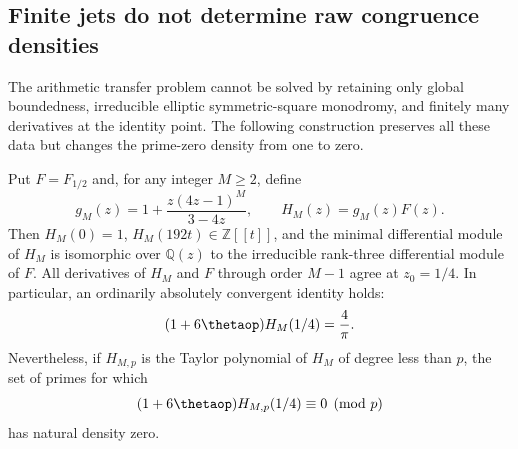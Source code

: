 \subsection{Finite jets do not determine raw congruence densities}
\label{subsec:C-gauge-obstruction}
The arithmetic transfer problem cannot be solved by retaining only
global boundedness, irreducible elliptic symmetric-square monodromy,
and finitely many derivatives at the identity point.  The following
construction preserves all these data but changes the prime-zero
density from one to zero.

\begin{proposition}\label{prop:C-finite-jet-density-zero}
Put $F=F_{1/2}$ and, for any integer $M\ge2$, define
\[
 g_M(z)=1+\frac{z(4z-1)^M}{3-4z},\qquad H_M(z)=g_M(z)F(z).
\]
Then $H_M(0)=1$, $H_M(192t)\in\mathbb Z[[t]]$, and the minimal
differential module of $H_M$ is isomorphic over $\mathbb Q(z)$ to
the irreducible rank-three differential module of $F$.
All derivatives of $H_M$ and $F$ through order $M-1$ agree at
$z_0=1/4$.  In particular, an ordinarily absolutely convergent
identity holds:
\[
 (1+6\thetaop)H_M(1/4)=\frac4\pi.
\]
Nevertheless, if $H_{M,p}$ is the Taylor polynomial of $H_M$ of
degree less than $p$, the set of primes for which
\[
 (1+6\thetaop)H_{M,p}(1/4)\equiv0\pmod p
\]
has natural density zero.
\end{proposition}
